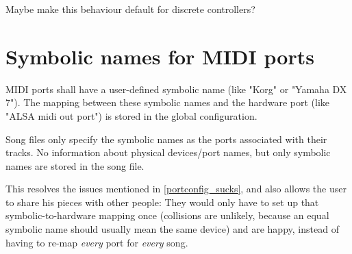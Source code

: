 \documentclass[a4paper]{report}
\begin{document}
Maybe make this behaviour default for discrete controllers?

\section{Symbolic names for MIDI ports} \label{symbolic_ports}
MIDI ports shall have a user-defined symbolic name (like "Korg" or "Yamaha DX 7").
The mapping between these symbolic names and the hardware port (like
"ALSA midi out port") is stored in the global configuration.

Song files only specify the symbolic names as the ports associated with
their tracks. No information about physical devices/port names, but only
symbolic names are stored in the song file.

This resolves the issues mentioned in \ref{portconfig_sucks}, and also
allows the user to share his pieces with other people: They would only
have to set up that symbolic-to-hardware mapping once (collisions are
unlikely, because an equal symbolic name should usually mean the same
device) and are happy, instead of having to re-map \emph{every} port
for \emph{every} song.
\end{document}
